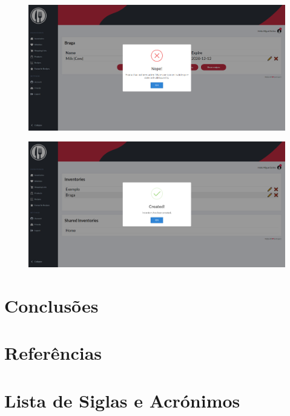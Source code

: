 \documentclass[a4paper]{report}
\begin{document}
    \begin{figure}[H]
        \centering
            \includegraphics[width=\textwidth]{images/produto_final/exemplo_erro.png}
    \end{figure}

    \begin{figure}[H]
        \centering
            \includegraphics[width=\textwidth]{images/produto_final/exemplo_sucesso.png}
    \end{figure}

\chapter{Conclusões}

\chapter{Referências}

\chapter{Lista de Siglas e Acrónimos}
\end{document}
